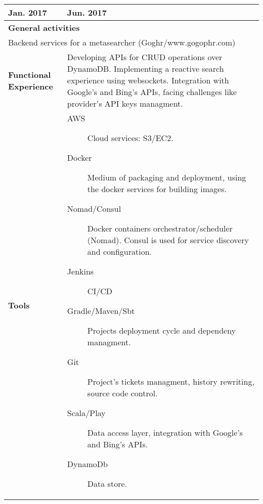 \begin{cventries}
\begin{tabular}{|p{4.5cm} | p{2cm} | p{4cm} | p{2cm} | p{2cm}|}
    Jan. 2017 & Jun. 2017 \\ 
    \hline
    \multicolumn{5}{|l|}{\textbf{General activities}} \\

     \multicolumn{5}{|p{15cm}|}{
       Backend services for a metasearcher (Goghr/www.gogophr.com)
       } \\
 \hline
    \textbf{Functional Experience} & \multicolumn{4}{p{12cm}|}{

      Developing APIs for CRUD operations over DynamoDB. Implementing a reactive search experience using websockets. Integration with Google's and Bing's APIs, facing challenges like provider's API keys managment.

      } \\
 \hline
      \textbf{Tools} & \multicolumn{4}{p{12cm}|}{
                       \begin{description}
                       
                        \item[AWS] Cloud services: S3/EC2.
                       
                       \item[Docker] Medium of packaging and deployment, using the docker services for building images.

                       \item[Nomad/Consul]  Docker containers orchestrator/scheduler (Nomad). Consul is used for service discovery and configuration.
                       
                       \item[Jenkins] CI/CD

                       \item[Gradle/Maven/Sbt] Projects deployment cycle and dependeny managment.

                       \item[Git]  Project's tickets managment, history rewriting, source code control.

                       \item[Scala/Play] Data access layer, integration with Google's and Bing's APIs.

                      \item[DynamoDb] Data store.

                       \end{description}
      } \\
 

    \hline


\end{tabular}
\end{cventries}
